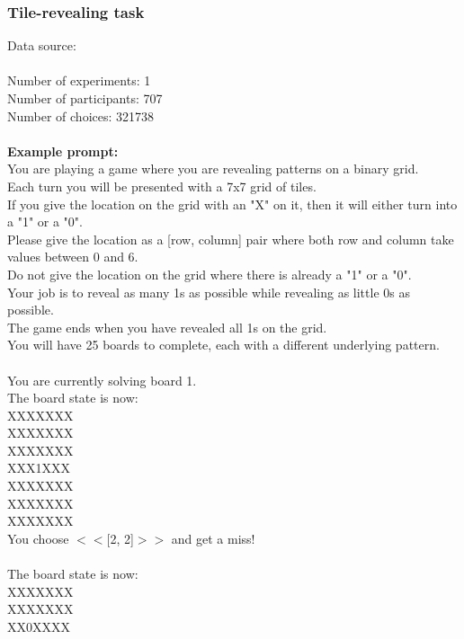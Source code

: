 \documentclass[pdflatex,sn-nature]{sn-jnl}%
\theoremstyle{thmstyleone}%
\theoremstyle{thmstyletwo}%
\theoremstyle{thmstylethree}%
\begin{document}
\subsubsection*{Tile-revealing task}
Data source: \cite{kumar2023disentangling} \\ $~$ \\
Number of experiments: 1 $~$\\ 
Number of participants: 707 $~$\\ 
Number of choices: 321738 $~$\\ 
 $~$\\ 
\textbf{Example prompt:}
 $~$\\ 
You are playing a game where you are revealing patterns on a binary grid. $~$\\ 
Each turn you will be presented with a 7x7 grid of tiles. $~$\\ 
If you give the location on the grid with an "X" on it, then it will either turn into a "1" or a "0". $~$\\ 
Please give the location as a [row, column] pair where both row and column take values between 0 and 6. $~$\\ 
Do not give the location on the grid where there is already a "1" or a "0". $~$\\ 
Your job is to reveal as many 1s as possible while revealing as little 0s as possible. $~$\\ 
The game ends when you have revealed all 1s on the grid. $~$\\ 
You will have 25 boards to complete, each with a different underlying pattern. $~$\\ 
 $~$\\ 
You are currently solving board 1. $~$\\ 
The board state is now: $~$\\ 
XXXXXXX $~$\\ 
XXXXXXX $~$\\ 
XXXXXXX $~$\\ 
XXX1XXX $~$\\ 
XXXXXXX $~$\\ 
XXXXXXX $~$\\ 
XXXXXXX $~$\\ 
You choose $<<$[2, 2]$>>$ and get a miss! $~$\\ 
 $~$\\ 
The board state is now: $~$\\ 
XXXXXXX $~$\\ 
XXXXXXX $~$\\ 
XX0XXXX $~$\\ 
\end{document}
